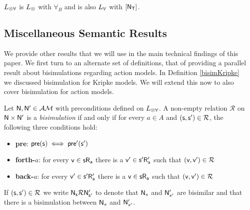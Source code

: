 $L_{\otimes\forall}$ is $L_{\otimes}$ with $\forall_B$ and is also $L_{\forall}$ with $[{\mathrm{\mathsf{N}}_\mathrm{\mathsf{T}}}]$.
%
%
%
%
%

\subsection{Miscellaneous Semantic Results}

We provide other results that we will use in the main technical findings of this paper.
We first turn to an alternate set of definitions, that of providing a parallel result about bisimulations regarding action models.
In Definition \ref{bisimKripke} we discussed bisimulation for Kripke models.
We will extend this now to also cover bisimulation for action models.

\begin{defn} \label{bisimEvent}
	Let $\mathrm{\mathsf{\mathrm{\mathsf{N}}, \mathrm{\mathsf{N}}'}} \in \mathcal{AM}$ with preconditions defined on $L_{\otimes\forall}$.
	A non-empty relation $\mathcal{R}$ on $\mathrm{\mathsf{\mathrm{\mathsf{N}}}} \times \mathrm{\mathsf{\mathrm{\mathsf{N}}'}}$ is a {\em bisimulation} if and only if for every $a \in A$
	and $\mathrm{\mathsf{(s, s') \in \mathcal{R}}}$, the following three conditions hold:
	\begin{itemize}
		\item {\bf pre}: $\mathrm{\mathsf{pre(s)}} \iff \mathrm{\mathsf{pre'(s')}}$
		\item {\bf forth-$a$}: for every $\mathrm{\mathsf{v \in s R_a}}$ there is a $\mathrm{\mathsf{v'
      \in s' R'_a}}$ such that $\mathrm{\mathsf{(v,v')}} \in \mathcal{R}$
		\item {\bf back-$a$}: for every $\mathrm{\mathsf{v' \in s' R'_a}}$ there is a $\mathrm{\mathsf{v
      \in s R_a}}$ such that $\mathrm{\mathsf{(v,v')}} \in
		\mathcal{R}$
	\end{itemize}
	If $\mathrm{\mathsf{(s, s') \in \mathcal{R}}}$ we write $\mathrm{\mathsf{\mathrm{\mathsf{N}}_s \mathcal{R} \mathrm{\mathsf{N}}'_{s'}}}$ to
  denote that $\mathrm{\mathsf{N}}_s$ and $\mathrm{\mathsf{N}}'_{s'}$ are bisimilar and
	that there is a bisimulation between $\mathrm{\mathsf{N}}_s$ and $\mathrm{\mathsf{N}}'_{s'}$.
\end{defn}


